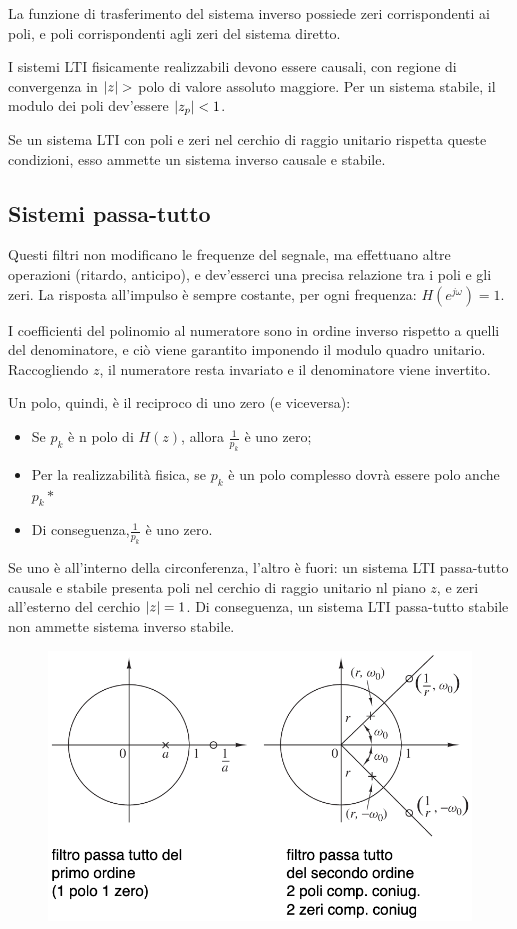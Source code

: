La funzione di trasferimento del sistema inverso possiede zeri corrispondenti ai poli, e poli corrispondenti agli zeri del sistema diretto.

I sistemi LTI fisicamente realizzabili devono essere causali, con regione di convergenza in $\left|z\right| >$ polo di valore assoluto maggiore. Per un sistema stabile, il modulo dei poli dev'essere $\left|z_p\right| < 1$.

Se un sistema LTI con poli e zeri nel cerchio di raggio unitario rispetta queste condizioni, esso ammette un sistema inverso causale e stabile.

\subsection{Sistemi passa-tutto}
Questi filtri non modificano le frequenze del segnale, ma effettuano altre operazioni (ritardo, anticipo), e dev'esserci una precisa relazione tra i poli e gli zeri. La risposta all'impulso è sempre costante, per ogni frequenza: $H(e^{j\omega}) = 1$.

I coefficienti del polinomio al numeratore sono in ordine inverso rispetto a quelli del denominatore, e ciò viene garantito imponendo il modulo quadro unitario. Raccogliendo $z$, il numeratore resta invariato e il denominatore viene invertito. 

Un polo, quindi, è il reciproco di uno zero (e viceversa):
\begin{itemize}
	\item Se $p_k$ è n polo di $H(z)$, allora $\frac{1}{p_k}$ è uno zero;
	\item Per la realizzabilità fisica, se $p_k$ è un polo complesso dovrà essere polo anche $p_k*$
	\item Di conseguenza,$\frac{1}{p_k}$ è uno zero.
\end{itemize}

Se uno è all'interno della circonferenza, l'altro è fuori: un sistema LTI passa-tutto causale e stabile presenta poli nel cerchio di raggio unitario nl piano $z$, e zeri all'esterno del cerchio $\left|z\right| = 1$. Di conseguenza, un sistema LTI passa-tutto stabile non ammette sistema inverso stabile.

\begin{figure}[h]
	\centering
	\includegraphics[scale=0.4]{Lezioni/Immagini/passatutto}
\end{figure}


